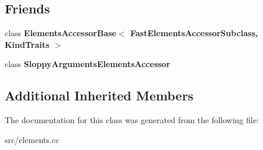 \subsection*{Friends}
\begin{DoxyCompactItemize}
\item 
\hypertarget{classv8_1_1internal_1_1_fast_elements_accessor_acdef8793a5fd7e2ee5e0f499c182ba10}{}class {\bfseries Elements\+Accessor\+Base$<$ Fast\+Elements\+Accessor\+Subclass, Kind\+Traits $>$}\label{classv8_1_1internal_1_1_fast_elements_accessor_acdef8793a5fd7e2ee5e0f499c182ba10}

\item 
\hypertarget{classv8_1_1internal_1_1_fast_elements_accessor_a9bed0841dc26dd4da2ab63034744726f}{}class {\bfseries Sloppy\+Arguments\+Elements\+Accessor}\label{classv8_1_1internal_1_1_fast_elements_accessor_a9bed0841dc26dd4da2ab63034744726f}

\end{DoxyCompactItemize}
\subsection*{Additional Inherited Members}


The documentation for this class was generated from the following file\+:\begin{DoxyCompactItemize}
\item 
src/elements.\+cc\end{DoxyCompactItemize}
